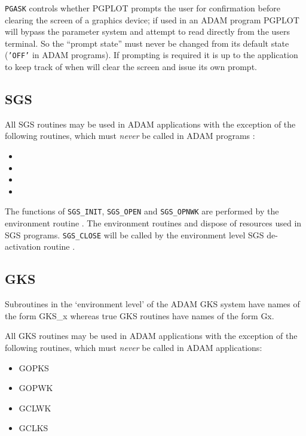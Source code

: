 \documentclass[twoside,11pt,nolof]{starlink}
\begin{document}
\texttt{PGASK} controls whether PGPLOT prompts the user for confirmation before
clearing
the screen of a graphics device; if used in an ADAM program PGPLOT will bypass
the parameter system and attempt to read directly from the users terminal. So
the ``prompt state'' must never be changed from its
default state ({\tt{'OFF'}} in
ADAM programs). If prompting is required it is up to the application to keep
track of when
will clear the screen and issue its own prompt.

\subsection{SGS}

All SGS routines may be used in ADAM applications with the exception of the
following routines, which must \emph{never} be called in ADAM programs :
\begin{itemize}
\item {}
\item {}
\item {}
\item {}
\end{itemize}
The functions of \texttt{SGS\_INIT}, \texttt{SGS\_OPEN} and \texttt{SGS\_OPNWK} are
performed by the environment routine .
The environment routines 
and  dispose of
resources used in SGS programs.  \texttt{SGS\_CLOSE} will be called by the
environment level SGS de-activation routine
.


\subsection{GKS}

Subroutines in the `environment level' of the ADAM GKS system have names of
the form GKS\_x whereas true GKS routines have names of the form Gx.

All GKS routines may be used in ADAM applications with the exception of the
following routines, which must \emph{never} be called in ADAM applications:

\begin{itemize}
\item GOPKS
\item GOPWK
\item GCLWK
\item GCLKS
\end{itemize}
\end{document}
